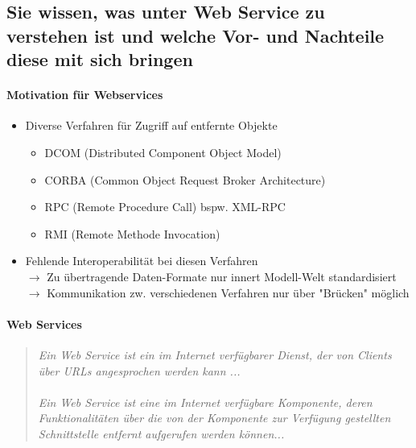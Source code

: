 \documentclass[a4paper]{article}
\begin{document}
		\subsection{Sie wissen, was unter Web Service zu verstehen ist und welche Vor- und Nachteile diese mit sich bringen}
		
		\paragraph{Motivation für Webservices}
		
			\begin{itemize}
				\item Diverse Verfahren für Zugriff auf entfernte Objekte
					\begin{itemize}
						\item DCOM (Distributed Component Object Model)
						\item CORBA (Common Object Request Broker Architecture)
						\item RPC (Remote Procedure Call) bspw. XML-RPC
						\item RMI (Remote Methode Invocation)
					\end{itemize}
				\item Fehlende Interoperabilität bei diesen Verfahren\\
				$\rightarrow$ Zu übertragende Daten-Formate nur innert Modell-Welt standardisiert\\
				$\rightarrow$ Kommunikation zw. verschiedenen Verfahren nur über "Brücken" möglich
			\end{itemize}
		
		\paragraph{Web Services}
		
			\begin{quote}
				\textit{Ein Web Service	ist ein im Internet verfügbarer Dienst, der von Clients über URLs angesprochen werden kann ... \\
				\\
				Ein Web Service ist eine im Internet verfügbare Komponente, deren Funktionalitäten über die von der Komponente zur Verfügung gestellten Schnittstelle entfernt aufgerufen werden können...}
			\end{quote}
		
\end{document}
